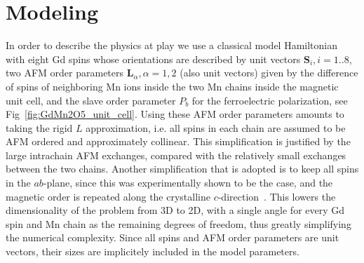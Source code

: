 \section{Modeling}
In order to describe the physics at play we use a classical model Hamiltonian with eight Gd spins whose orientations are described by unit vectors $\mathbf{S}_i, i=1..8$, two AFM order parameters $\mathbf{L}_\alpha, \alpha=1,2$ (also unit vectors) given by the difference of spins of neighboring Mn ions inside the two Mn chains inside the magnetic unit cell, and the slave order parameter $P_b$ for the ferroelectric polarization, see Fig~\ref{fig:GdMn2O5_unit_cell}.
Using these AFM order parameters amounts to taking the rigid $L$ approximation, i.e. all spins in each chain are assumed to be AFM ordered and approximately collinear. This simplification is justified by the large intrachain AFM exchanges, compared with the relatively small exchanges between the two chains.
Another simplification that is adopted is to keep all spins in the $ab$-plane, since this was experimentally shown to be the case, and the magnetic order is repeated along the crystalline $c$-direction~\cite{Lee13}.
This lowers the dimensionality of the problem from 3D to 2D, with a single angle for every Gd spin and Mn chain as the remaining degrees of freedom, thus greatly simplifying the numerical complexity.
Since all spins and AFM order parameters are unit vectors, their sizes are implicitely included in the model parameters.

